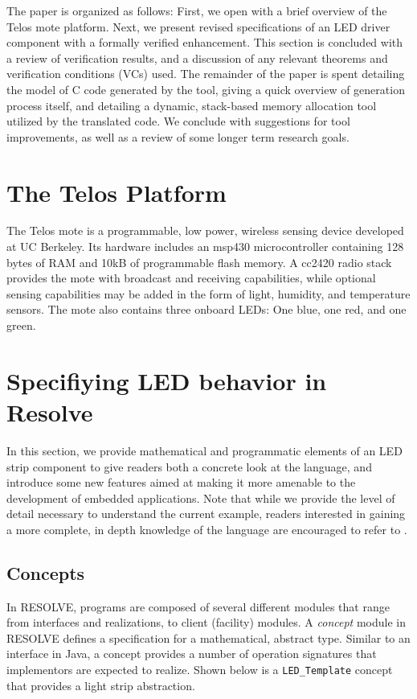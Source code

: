 \documentclass{sig-alternate}
\begin{document}
The paper is organized as follows: First, we open with a brief overview of the Telos mote platform. Next, we present revised specifications of an LED driver component with a formally verified enhancement. This section is concluded with a review of verification results, and a discussion of any relevant theorems and verification conditions (VCs) used. The remainder of the paper is spent detailing the model of C code generated by the tool, giving a quick overview of generation process itself, and detailing a dynamic, stack-based memory allocation tool utilized by the translated code. We conclude with suggestions for tool improvements, as well as a review of some longer term research goals.

\section{The Telos Platform}

The Telos mote \cite{polastre:2005} is a programmable, low power, wireless sensing device developed at UC Berkeley. Its hardware includes an msp430 microcontroller containing 128 bytes of RAM and 10kB of programmable flash memory. A cc2420 radio stack provides the mote with broadcast and receiving capabilities, while optional sensing capabilities may be added in the form of light, humidity, and temperature sensors. The mote also contains three onboard LEDs: One blue, one red, and one green.

\section{Specifiying LED behavior in Resolve}
\label{sec:specifiying}

In this section, we provide mathematical and programmatic elements of an LED strip component to give readers both a concrete look at the language, and introduce some new features aimed at making it more amenable to the development of embedded applications. Note that while we provide the level of detail necessary to understand the current example, readers interested in gaining a more complete, in depth knowledge of the language are encouraged to refer to \cite{sitaraman:2011, kulczycki:2008}.

\subsection{Concepts}
\label{ssec:concepts}
In RESOLVE, programs are composed of several different modules that range from interfaces and realizations, to client (facility) modules. A \textit{concept} module in RESOLVE defines a specification for a mathematical, abstract type. Similar to an interface in Java, a concept provides a number of operation signatures that implementors are expected to realize. Shown below is a \texttt{LED\_Template} concept that provides a light strip abstraction.
\end{document}
